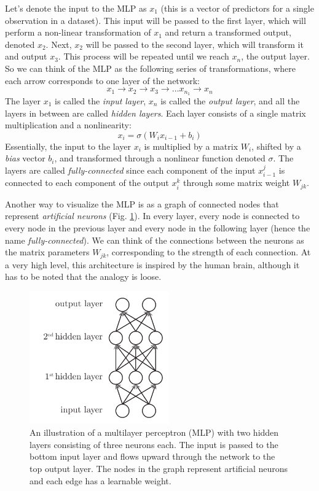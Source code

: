 \documentclass[12pt]{article}
\begin{document}
Let's denote the input to the MLP as $x_1$ (this is a vector of predictors for a single observation in a dataset). This input will be passed to the first layer, which will perform a non-linear transformation of $x_1$ and return a transformed output, denoted $x_2$. Next, $x_2$ will be passed to the second layer, which will transform it and output $x_3$. This process will be repeated until we reach $x_n$, the output layer. So we can think of the MLP as the following series of transformations, where each arrow corresponds to one layer of the network:
\begin{equation}
x_1 \rightarrow x_2 \rightarrow x_3 \rightarrow \ldots x_{n_1} \rightarrow x_n
\end{equation}
The layer $x_1$ is called the \textit{input layer}, $x_n$ is called the \textit{output layer}, and all the layers in between are called \textit{hidden layers}. Each layer consists of a single matrix multiplication and a nonlinearity:
\begin{equation}
x_i = \sigma(W_i x_{i-1} + b_i)
\end{equation}
Essentially, the input to the layer $x_i$ is multiplied by a matrix $W_i$, shifted by a \textit{bias} vector $b_i$, and transformed through a nonlinear function denoted $\sigma$. The layers are called \textit{fully-connected} since each component of the input $x_{i-1}^j$ is connected to each component of the output $x_i^k$ through some matrix weight $W_{jk}$.

Another way to visualize the MLP is as a graph of connected nodes that represent \textit{artificial neurons} (Fig. \ref{fig_mlp}). In every layer, every node is connected to every node in the previous layer and every node in the following layer (hence the name \textit{fully-connected}). We can think of the connections between the neurons as the matrix parameters $W_{jk}$, corresponding to the strength of each connection. At a very high level, this architecture is inspired by the human brain, although it has to be noted that the analogy is loose.

\begin{figure}[H]
\centering
\includegraphics[width=6cm]{illustrations/mlp.pdf}
\caption{An illustration of a multilayer perceptron (MLP) with two hidden layers consisting of three neurons each. The input is passed to the bottom input layer and flows upward through the network to the top output layer. The nodes in the graph represent artificial neurons and each edge has a learnable weight.}
\label{fig_mlp}
\end{figure}
\end{document}
